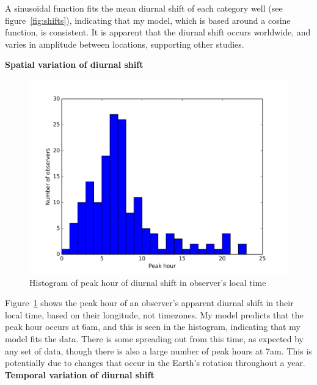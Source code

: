 \documentclass[landscape,a0paper,fontscale=0.400]{baposter} %
\begin{document}
\begin{poster}
{\begin{multicols}{2}
A sinusoidal function fits the mean diurnal shift of each category well (see figure~\ref{fig:shifts}), indicating that my model, which is based around a cosine function, is consistent. It is apparent that the diurnal shift occurs worldwide, and varies in amplitude between locations, supporting other studies. \\

\vspace{2em}
\vfill\null
\columnbreak

{\large \bf Spatial variation of diurnal shift\\}

\begin{figure}
	\centering
	\includegraphics[width=\linewidth]{hist}
	\caption{Histogram of peak hour of diurnal shift in observer's local time \label{fig:hist}}
\end{figure}

Figure~\ref{fig:hist} shows the peak hour of an observer's apparent diurnal shift in their local time, based on their longitude, not timezones. My model predicts that the peak hour occurs at 6am, and this is seen in the histogram, indicating that my model fits the data. There is some spreading out from this time, as expected by any set of data, though there is also a large number of peak hours at 7am. This is potentially due to changes that occur in the Earth's rotation throughout a year.\\ 

{\large \bf Temporal variation of diurnal shift\\}


\end{multicols}}
\end{poster}
\end{document}
